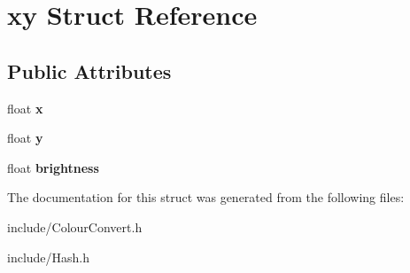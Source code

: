 \hypertarget{structxy}{}\section{xy Struct Reference}
\label{structxy}
\subsection*{Public Attributes}
\begin{DoxyCompactItemize}
\item 
float {\bfseries x}\hypertarget{structxy_a399b28667f1855602ec1c69218074f62}{}\label{structxy_a399b28667f1855602ec1c69218074f62}

\item 
float {\bfseries y}\hypertarget{structxy_a2dd8adb1889bf29804a03bbd785b3ca2}{}\label{structxy_a2dd8adb1889bf29804a03bbd785b3ca2}

\item 
float {\bfseries brightness}\hypertarget{structxy_a006761dded51d417af4d3d47885e5b5d}{}\label{structxy_a006761dded51d417af4d3d47885e5b5d}

\end{DoxyCompactItemize}


The documentation for this struct was generated from the following files\+:\begin{DoxyCompactItemize}
\item 
include/Colour\+Convert.\+h\item 
include/Hash.\+h\end{DoxyCompactItemize}
